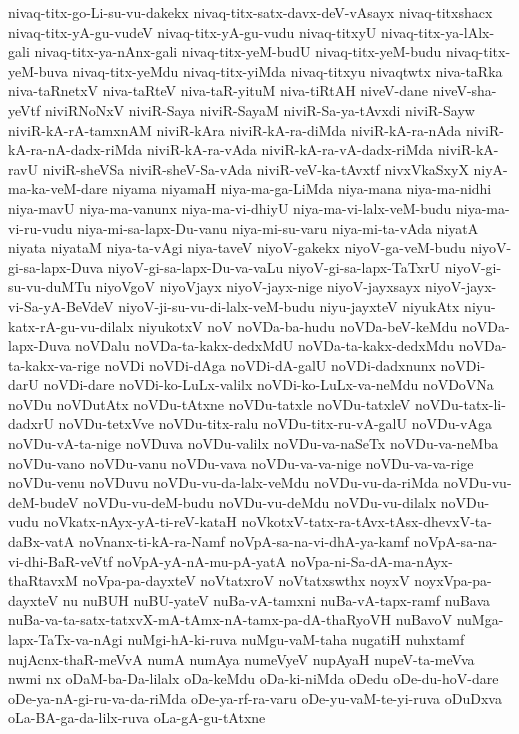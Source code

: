 {nivaq-titx-go-Li-su-vu-dakekx
nivaq-titx-satx-davx-deV-vAsayx
nivaq-titxshacx
nivaq-titx-yA-gu-vudeV
nivaq-titx-yA-gu-vudu
nivaq-titxyU
nivaq-titx-ya-lAlx-gali
nivaq-titx-ya-nAnx-gali
nivaq-titx-yeM-budU
nivaq-titx-yeM-budu
nivaq-titx-yeM-buva
nivaq-titx-yeMdu
nivaq-titx-yiMda
nivaq-titxyu
nivaqtwtx
niva-taRka
niva-taRnetxV
niva-taRteV
niva-taR-yituM
niva-tiRtAH
niveV-dane
niveV-sha-yeVtf
niviRNoNxV
niviR-Saya
niviR-SayaM
niviR-Sa-ya-tAvxdi
niviR-Sayw
niviR-kA-rA-tamxnAM
niviR-kAra
niviR-kA-ra-diMda
niviR-kA-ra-nAda
niviR-kA-ra-nA-dadx-riMda
niviR-kA-ra-vAda
niviR-kA-ra-vA-dadx-riMda
niviR-kA-ravU
niviR-sheVSa
niviR-sheV-Sa-vAda
niviR-veV-ka-tAvxtf
nivxVkaSxyX
niyA-ma-ka-veM-dare
niyama
niyamaH
niya-ma-ga-LiMda
niya-mana
niya-ma-nidhi
niya-mavU
niya-ma-vanunx
niya-ma-vi-dhiyU
niya-ma-vi-lalx-veM-budu
niya-ma-vi-ru-vudu
niya-mi-sa-lapx-Du-vanu
niya-mi-su-varu
niya-mi-ta-vAda
niyatA
niyata
niyataM
niya-ta-vAgi
niya-taveV
niyoV-gakekx
niyoV-ga-veM-budu
niyoV-gi-sa-lapx-Duva
niyoV-gi-sa-lapx-Du-va-vaLu
niyoV-gi-sa-lapx-TaTxrU
niyoV-gi-su-vu-duMTu
niyoVgoV
niyoVjayx
niyoV-jayx-nige
niyoV-jayxsayx
niyoV-jayx-vi-Sa-yA-BeVdeV
niyoV-ji-su-vu-di-lalx-veM-budu
niyu-jayxteV
niyukAtx
niyu-katx-rA-gu-vu-dilalx
niyukotxV
noV
noVDa-ba-hudu
noVDa-beV-keMdu
noVDa-lapx-Duva
noVDalu
noVDa-ta-kakx-dedxMdU
noVDa-ta-kakx-dedxMdu
noVDa-ta-kakx-va-rige
noVDi
noVDi-dAga
noVDi-dA-galU
noVDi-dadxnunx
noVDi-darU
noVDi-dare
noVDi-ko-LuLx-valilx
noVDi-ko-LuLx-va-neMdu
noVDoVNa
noVDu
noVDutAtx
noVDu-tAtxne
noVDu-tatxle
noVDu-tatxleV
noVDu-tatx-li-dadxrU
noVDu-tetxVve
noVDu-titx-ralu
noVDu-titx-ru-vA-galU
noVDu-vAga
noVDu-vA-ta-nige
noVDuva
noVDu-valilx
noVDu-va-naSeTx
noVDu-va-neMba
noVDu-vano
noVDu-vanu
noVDu-vava
noVDu-va-va-nige
noVDu-va-va-rige
noVDu-venu
noVDuvu
noVDu-vu-da-lalx-veMdu
noVDu-vu-da-riMda
noVDu-vu-deM-budeV
noVDu-vu-deM-budu
noVDu-vu-deMdu
noVDu-vu-dilalx
noVDu-vudu
noVkatx-nAyx-yA-ti-reV-kataH
noVkotxV-tatx-ra-tAvx-tAsx-dhevxV-ta-daBx-vatA
noVnanx-ti-kA-ra-Namf
noVpA-sa-na-vi-dhA-ya-kamf
noVpA-sa-na-vi-dhi-BaR-veVtf
noVpA-yA-nA-mu-pA-yatA
noVpa-ni-Sa-dA-ma-nAyx-thaRtavxM
noVpa-pa-dayxteV
noVtatxroV
noVtatxswthx
noyxV
noyxVpa-pa-dayxteV
nu
nuBUH
nuBU-yateV
nuBa-vA-tamxni
nuBa-vA-tapx-ramf
nuBava
nuBa-va-ta-satx-tatxvX-mA-tAmx-nA-tamx-pa-dA-thaRyoVH
nuBavoV
nuMga-lapx-TaTx-va-nAgi
nuMgi-hA-ki-ruva
nuMgu-vaM-taha
nugatiH
nuhxtamf
nujAcnx-thaR-meVvA
numA
numAya
numeVyeV
nupAyaH
nupeV-ta-meVva
nwmi
nx
oDaM-ba-Da-lilalx
oDa-keMdu
oDa-ki-niMda
oDedu
oDe-du-hoV-dare
oDe-ya-nA-gi-ru-va-da-riMda
oDe-ya-rf-ra-varu
oDe-yu-vaM-te-yi-ruva
oDuDxva
oLa-BA-ga-da-lilx-ruva
oLa-gA-gu-tAtxne
}
